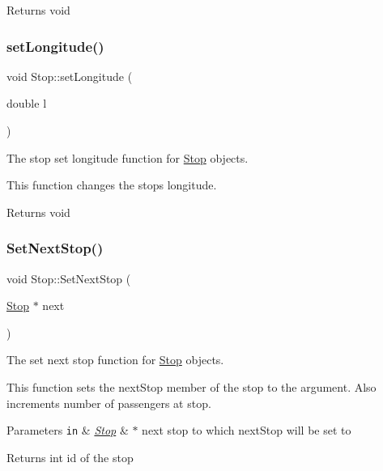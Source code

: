 \begin{DoxyReturn}{Returns}
void 
\end{DoxyReturn}
\mbox{\label{classStop_a26866e7dfd469467c67d4176693b53c7}} 
\subsubsection{\texorpdfstring{set\+Longitude()}{setLongitude()}}
{\footnotesize\ttfamily void Stop\+::set\+Longitude (\begin{DoxyParamCaption}\item[{double}]{l }\end{DoxyParamCaption})}



The stop set longitude function for \hyperlink{classStop}{Stop} objects. 

This function changes the stop\textquotesingle{}s longitude.

\begin{DoxyReturn}{Returns}
void 
\end{DoxyReturn}
\mbox{\label{classStop_a7e39a7138f5bcf8f144155de7b1ae1aa}} 
\subsubsection{\texorpdfstring{Set\+Next\+Stop()}{SetNextStop()}}
{\footnotesize\ttfamily void Stop\+::\+Set\+Next\+Stop (\begin{DoxyParamCaption}\item[{\hyperlink{classStop}{Stop} $\ast$}]{next }\end{DoxyParamCaption})\hspace{0.3cm}{\ttfamily [inline]}}



The set next stop function for \hyperlink{classStop}{Stop} objects. 

This function sets the next\+Stop member of the stop to the argument. Also increments number of passengers at stop.


\begin{DoxyParams}[1]{Parameters}
\mbox{\tt in}  & {\em \hyperlink{classStop}{Stop}} & $\ast$ next stop to which next\+Stop will be set to\\
\hline
\end{DoxyParams}
\begin{DoxyReturn}{Returns}
int id of the stop 
\end{DoxyReturn}
\mbox{\label{classStop_aa373ae256ce6bc01ef13e876dfdec5bd}} 
